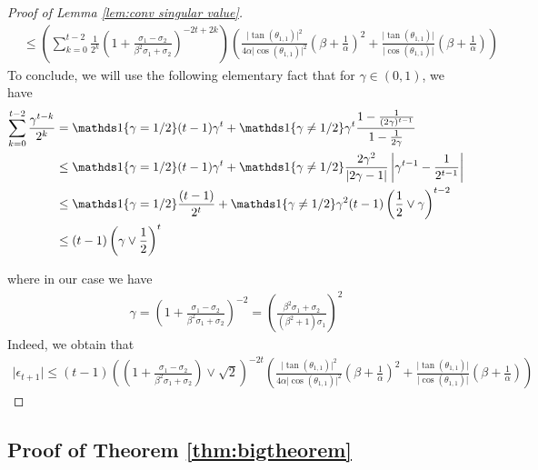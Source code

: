 \begin{proof}[Proof of Lemma \ref{lem:conv singular value}]
\begin{align*}
        & \le \left(\sum_{k = 0}^{t-2} \frac{1}{2^k} \left( 1 + \frac{\sigma_1 - \sigma_2 }{\beta^2 \sigma_1 + \sigma_2 }\right)^{-2t + 2k} \right) \left(  \frac{\vert \tan(\theta_{1,1})\vert^2}{4\alpha \vert \cos(\theta_{1,1})\vert^2} \left(\beta + \frac{1}{\alpha}\right)^2 + \frac{\vert \tan(\theta_{1,1})\vert}{\vert \cos(\theta_{1,1})\vert}\left(\beta + \frac{1}{\alpha}\right) \right)  
    \end{align*}
    To conclude, we will use the following elementary fact that for $\gamma \in (0,1)$, we have 
    \begin{align*}
        \sum_{k=0}^{t-2}\frac{\gamma^{t-k}}{2^k} & = \indicator\lbrace \gamma = 1/2\rbrace (t-1)\gamma^t + \indicator\lbrace \gamma \neq 1/2\rbrace  \gamma^t \frac{1 - \frac{1}{(2\gamma)^{t-1}}}{1- \frac{1}{2\gamma}} \\
        & \le \indicator\lbrace \gamma = 1/2\rbrace (t-1)\gamma^t + \indicator\lbrace \gamma \neq 1/2\rbrace  \frac{2 \gamma^2}{\vert 2\gamma - 1\vert} \left\vert \gamma^{t-1}  - \frac{1}{2^{t-1}}\right\vert \\
        & \le \indicator\lbrace \gamma = 1/2\rbrace \frac{(t-1)}{2^t} + \indicator\lbrace \gamma \neq 1/2\rbrace \gamma^2 (t-1) \left( \frac{1}{2} \vee \gamma \right)^{t-2} \\
        & \le (t-1)\left( \gamma \vee \frac{1}{2}\right)^{t}
    \end{align*}
  
    where in our case we have 
    \begin{align*}
        \gamma = \left( 1 + \frac{\sigma_1 - \sigma_2 }{\beta^2 \sigma_1 + \sigma_2 }\right)^{-2} = \left(\frac{\beta^2\sigma_1 + \sigma_2}{(\beta^2 + 1) \sigma_1} \right)^2
    \end{align*}
    Indeed, we obtain that 
    \begin{align*}
         \vert \epsilon_{t+1} \vert \le  \left(t-1 \right) \left( \left(1 + \frac{\sigma_1 - \sigma_2}{\beta^2 \sigma_1 + \sigma_2}\right) \vee \sqrt{2}\right)^{-2t}   \left(  \frac{\vert \tan(\theta_{1,1})\vert^2}{4\alpha \vert \cos(\theta_{1,1})\vert^2} \left(\beta + \frac{1}{\alpha}\right)^2 + \frac{\vert \tan(\theta_{1,1})\vert}{\vert \cos(\theta_{1,1})\vert}\left(\beta + \frac{1}{\alpha}\right) \right) 
    \end{align*}
\end{proof}



\subsection{Proof of Theorem \ref{thm:bigtheorem}}


